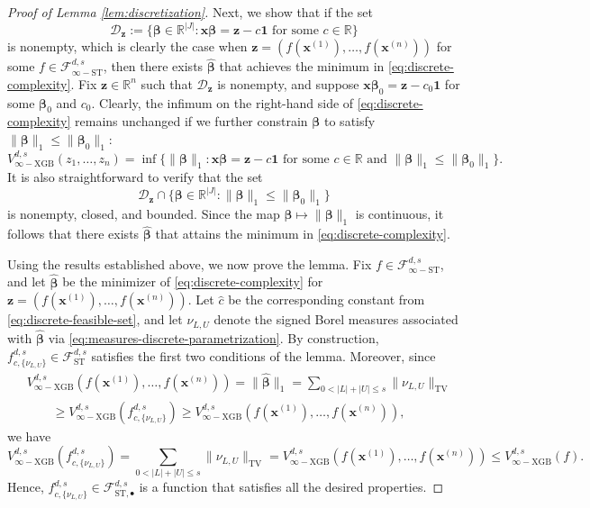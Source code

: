 \documentclass[10pt,a4paper]{amsart}
\newcommand{\R}{{\mathbb R}}
\newcommand{\betabf}{{\boldsymbol{\beta}}}
\newcommand{\fcnu}{{f^{d, s}_{c, \{\nu_{L, U}\}}}}
\newcommand{\fstinf}{{\mathcal{F}^{d, s}_{\infty-\text{ST}}}}
\newcommand{\fstmid}{{\mathcal{F}^{d, s}_{\text{ST}, \bullet}}}
\newcommand{\fst}{{\mathcal{F}^{d, s}_{\text{ST}}}}
\newcommand{\onevec}{{\mathbf{1}}}
\newcommand{\vinfxgb}{{V^{d, s}_{\infty-\text{XGB}}}}
\newcommand{\xbf}{{\mathbf{x}}}
\newcommand{\zbf}{{\mathbf{z}}}
\begin{document}
\begin{proof}[Proof of Lemma \ref{lem:discretization}]
Next, we show that if the set 
\begin{equation}\label{eq:discrete-feasible-set}
    \mathcal{D}_{\zbf} := \big\{\betabf \in \R^{|J|}: 
    \xbf \betabf = \zbf - c \onevec 
    \text{ for some } c \in \R\big\}
\end{equation}
is nonempty, which is clearly the case when
$\zbf = (f(\xbf^{(1)}), \dots, f(\xbf^{(n)}))$ 
for some $f \in \fstinf$, then there exists $\hat{\betabf}$ that achieves 
the minimum in \eqref{eq:discrete-complexity}.
Fix $\zbf \in \R^n$ such that $\mathcal{D}_{\zbf}$ is 
nonempty, and suppose $\xbf \betabf_0 = \zbf - c_0 \onevec$ 
for some $\betabf_0$ and $c_0$.
Clearly, the infimum on the right-hand side of 
\eqref{eq:discrete-complexity} remains unchanged if we further 
constrain $\betabf$ to satisfy $\|\betabf\|_1 \le \|\betabf_0\|_1$:
\begin{equation*}
    \vinfxgb(z_1, \dots, z_n) = \inf \big\{\|\betabf\|_1: \xbf \betabf 
    = \zbf - c \onevec \text{ for some } c \in \R 
    \text{ and } \|\betabf\|_1 \le \|\betabf_0\|_1\big\}.
\end{equation*}
It is also straightforward to verify that the set
\begin{equation*}
    \mathcal{D}_{\zbf} \cap \{\betabf \in \R^{|J|}: 
    \|\betabf\|_1 \le \|\betabf_0\|_1\}
\end{equation*}
is nonempty, closed, and bounded.
Since the map $\betabf \mapsto \|\betabf\|_1$ is continuous, it follows 
that there exists $\hat{\betabf}$ that attains the minimum in
\eqref{eq:discrete-complexity}.

Using the results established above, we now prove the lemma. 
Fix $f \in \fstinf$, and let $\hat{\betabf}$ be the minimizer of 
\eqref{eq:discrete-complexity} for $\zbf = (f(\xbf^{(1)}), \dots, 
f(\xbf^{(n)}))$.
Let $\hat{c}$ be the corresponding constant from 
\eqref{eq:discrete-feasible-set}, and let 
$\nu_{L, U}$ denote the signed Borel measures associated with 
$\hat{\betabf}$ via \eqref{eq:measures-discrete-parametrization}.
By construction, $\fcnu \in \fst$ 
satisfies the first two conditions of the lemma. 
Moreover, since
\begin{equation*}
\begin{aligned}
    &\vinfxgb(f(\xbf^{(1)}), \dots, f(\xbf^{(n)})) 
    = \|\hat{\betabf}\|_1 
    = \sum_{0 < |L| + |U| \le s} \|\nu_{L, U}\|_{\text{TV}} \\
    &\qquad \ge \vinfxgb(\fcnu)
    \ge \vinfxgb(f(\xbf^{(1)}), \dots, f(\xbf^{(n)})),
\end{aligned}
\end{equation*} 
we have
\begin{equation*}
    \vinfxgb(\fcnu) 
    = \sum_{0 < |L| + |U| \le s} \|\nu_{L, U}\|_{\text{TV}}
    = \vinfxgb(f(\xbf^{(1)}), \dots, f(\xbf^{(n)})) 
    \le \vinfxgb(f).
\end{equation*}
Hence, $\fcnu \in \fstmid$ is a function that satisfies 
all the desired properties.
\end{proof}
\end{document}
